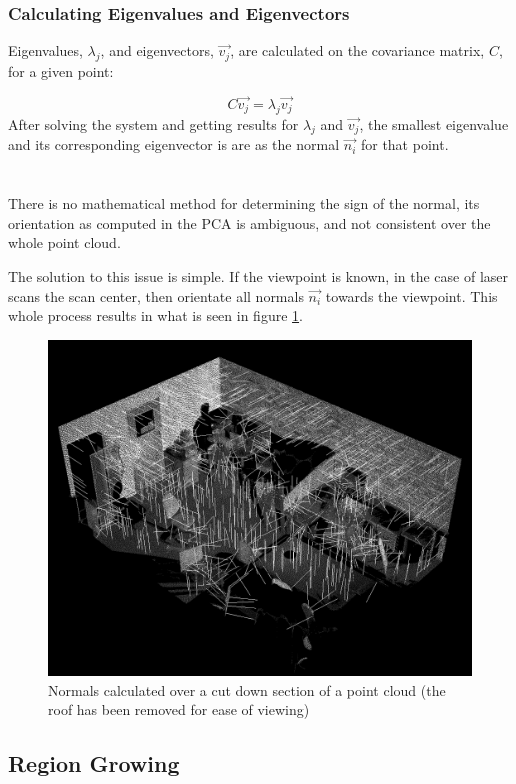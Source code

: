 		\subsubsection{Calculating Eigenvalues and Eigenvectors}
			Eigenvalues, $\lambda_j$, and eigenvectors, $\vec{v_j}$, are calculated on the covariance matrix, $C$, for a given point:
			
			\begin{equation}
			C \vec{v_j} = \lambda_j \vec{v_j}
			\end{equation}
			After solving the system and getting results for $\lambda_j$ and $\vec{v_j}$, the smallest eigenvalue and its corresponding eigenvector is are as the normal $\vec{n_i}$ for that point.\\
			\\
			\\
			There is no mathematical method for determining the sign of the normal, its orientation as computed in the PCA is ambiguous, and not consistent over the whole point cloud. 
			
			The solution to this issue is simple. If the viewpoint is known, in the case of laser scans the scan center, then orientate all normals $\vec{n_i}$ towards the viewpoint. This whole process results in what is seen in figure \ref{fig:Normals}.
			
			\begin{figure}[H]
			\centering
			\includegraphics[width=0.7\linewidth]{Includes/images/Normals}
			\caption{Normals calculated over a cut down section of a point cloud (the roof has been removed for ease of viewing)}
			\label{fig:Normals}
			\end{figure}
		

				
	\subsection{Region Growing}
		
